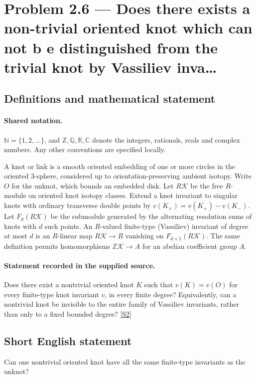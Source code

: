 \documentclass[11pt]{article}
\newcommand{\sref}[2]{\hyperlink{source:#1:#2}{[S#2]}}
\begin{document}
\section{Problem 2.6 — Does there exists a non-trivial oriented knot which can not b e distinguished from the trivial knot by Vassiliev inva…}\label{statement}

\subsection{Definitions and mathematical statement}

\paragraph{Shared notation.}$\mathbb N=\{1,2,\ldots\}$, and $\mathbb Z,\mathbb Q,\mathbb R,\mathbb C$ denote the integers, rationals, reals and complex numbers. Any other conventions are specified locally.


A knot or link is a smooth oriented embedding of one or more circles in the oriented $3$-sphere, considered up to orientation-preserving ambient isotopy. Write $O$ for the unknot, which bounds an embedded disk. Let $R\mathcal K$ be the free $R$-module on oriented knot isotopy classes. Extend a knot invariant to singular knots with ordinary transverse double points by $v(K_\times)=v(K_+)-v(K_-)$. Let $F_d(R\mathcal K)$ be the submodule generated by the alternating resolution sums of knots with $d$ such points. An $R$-valued finite-type (Vassiliev) invariant of degree at most $d$ is an $R$-linear map $R\mathcal K\to R$ vanishing on $F_{d+1}(R\mathcal K)$. The same definition permits homomorphisms $\mathbb Z\mathcal K\to A$ for an abelian coefficient group $A$.
\paragraph{Statement recorded in the supplied source.}
Does there exist a nontrivial oriented knot $K$ such that $v(K)=v(O)$ for every finite-type knot invariant $v$, in every finite degree? Equivalently, can a nontrivial knot be invisible to the entire family of Vassiliev invariants, rather than only to a fixed bounded degree? \sref{statement}{2}
\subsection{Short English statement}
Can one nontrivial oriented knot have all the same finite-type invariants as the unknot?
\end{document}

